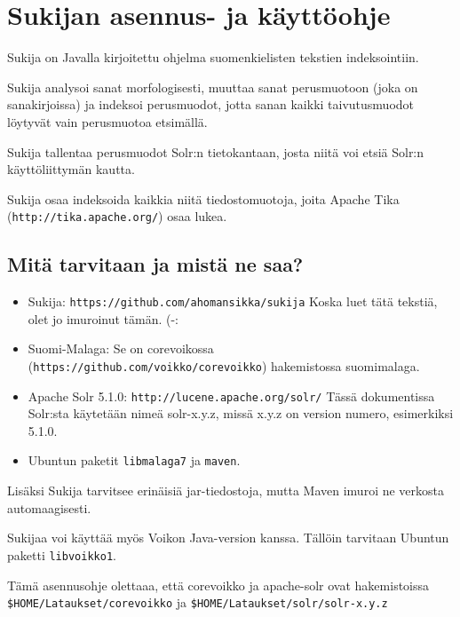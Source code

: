 \documentclass[12pt]{article}
\begin{document}
\pagestyle{fancy}
\setlength{\parindent}{0pt}
\setlength{\parskip}{1ex plus 0.5ex minus 0.2ex}
\section*{Sukijan asennus- ja käyttöohje}


Sukija on Javalla kirjoitettu ohjelma suomenkielisten tekstien
indeksointiin.

Sukija analysoi sanat morfologisesti, muuttaa sanat perusmuotoon (joka
on sanakirjoissa) ja indeksoi perusmuodot, jotta sanan kaikki
taivutusmuodot löytyvät vain perusmuotoa etsimällä.

Sukija tallentaa perusmuodot Solr:n tietokantaan, josta niitä voi
etsiä Solr:n käyttöliittymän kautta.

Sukija osaa indeksoida kaikkia niitä tiedostomuotoja, joita Apache
Tika (\verb=http://tika.apache.org/=) osaa lukea.

\subsection*{Mitä tarvitaan ja mistä ne saa?}

\begin{itemize}

\item Sukija:
      \verb=https://github.com/ahomansikka/sukija=
      Koska luet tätä tekstiä, olet jo imuroinut tämän. (-:

\item Suomi-Malaga: Se on corevoikossa
      (\verb=https://github.com/voikko/corevoikko=)
      hakemistossa suomimalaga.

\item Apache Solr 5.1.0:
      \verb=http://lucene.apache.org/solr/=
      Tässä dokumentissa Solr:sta käytetään nimeä solr-x.y.z,
      missä x.y.z on version numero, esimerkiksi 5.1.0.

\item Ubuntun paketit \verb=libmalaga7= ja \verb=maven=.
\end{itemize}

Lisäksi Sukija tarvitsee erinäisiä jar-tiedostoja, mutta Maven imuroi
ne verkosta automaagisesti.

Sukijaa voi käyttää myös Voikon Java-version kanssa. Tällöin tarvitaan
Ubuntun paketti \verb=libvoikko1=.

Tämä asennusohje olettaaa, että corevoikko ja apache-solr ovat hakemistoissa
\verb=$HOME/Lataukset/corevoikko= ja
\verb=$HOME/Lataukset/solr/solr-x.y.z=
\end{document}
